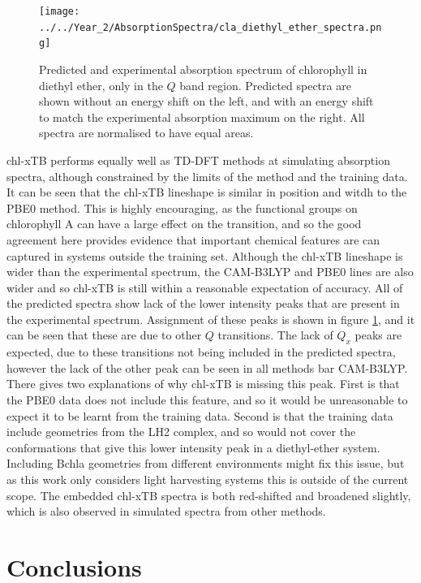 \begin{figure}
    \centering
    \texttt{[image: ../../Year\_2/AbsorptionSpectra/cla\_diethyl\_ether\_spectra.png]}
    \caption{Predicted and experimental absorption spectrum of chlorophyll in diethyl 
    ether, only in the $Q$ band region. Predicted spectra are shown without an energy
    shift on the left, and with an energy shift to match the experimental absorption
    maximum on the right. All spectra are normalised to have equal areas.}
    \label{fig:chl_diethyl_ether}
\end{figure}

chl-xTB performs equally well as TD-DFT methods at simulating absorption spectra,
although constrained by the limits of the method and the training data. It can be
seen that the chl-xTB lineshape is similar in position and witdh to the PBE0 method.
This is highly encouraging, as the functional groups on chlorophyll A
can have a large effect on the \Qy transition, and so the good agreement here provides
evidence that important chemical features are can captured in systems outside the 
training set. Although the chl-xTB lineshape is wider than the experimental spectrum,
the CAM-B3LYP and PBE0 lines are also wider and so chl-xTB is still within a reasonable
expectation of accuracy.
All of the predicted spectra show lack of the lower intensity peaks that are present 
in the experimental spectrum. Assignment of these peaks is shown in figure \ref{fig:chl_diethyl_ether},
and it can be seen that these are due to other $Q$ transitions. The lack of $Q_x$ 
peaks are expected, due to these transitions not being included in the predicted 
spectra, however the lack of the other \Qy peak can be seen in all methods bar CAM-B3LYP.
There gives two explanations of why chl-xTB is missing this peak. First is that the
PBE0 data does not include this feature, and so it would be unreasonable to expect
it to be learnt from the training data. Second is that the training data include 
geometries from the LH2 complex, and so would not cover the conformations that give
this lower intensity peak in a diethyl-ether system. Including Bchla geometries
from different environments might fix this issue, but as this work only considers
light harvesting systems this is outside of the current scope. The embedded chl-xTB
spectra is both red-shifted and broadened slightly, which is also observed in simulated
spectra from other methods.

\section{Conclusions}
\label{sec:chl_conclusions}


